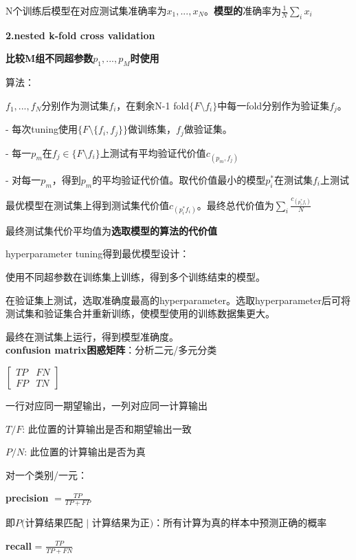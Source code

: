 \documentclass[UTF8]{ctexart}
\begin{document}
  \quad \quad \quad N个训练后模型在对应测试集准确率为${x_1, ..., x_N}$。\textbf{模型的}准确率为$\frac{1}{N}\sum_ix_i$

  \quad \textbf{2.nested k-fold cross validation}

  \quad \quad \textbf{比较M组不同超参数$p_1, ..., p_M$时使用}

  \quad \quad 算法：
  
  \quad \quad \quad $f_1, ..., f_N$分别作为测试集$f_i$，在剩余N-1 fold$\{F\setminus f_i\}$中每一fold分别作为验证集$f_j$。

  \quad \quad \quad - 每次tuning使用$\{F\setminus \{f_i, f_j\}\}$做训练集，$f_j$做验证集。

  \quad \quad \quad - 每一$p_m$在$f_j \in \{F \setminus f_i\}$上测试有平均验证代价值$c_{(p_m, f_j)}$

  \quad \quad \quad - 对每一$p_m$，得到$p_m$的平均验证代价值。取代价值最小的模型$p^*_i$在测试集$f_i$上测试

  \quad \quad \quad 最优模型在测试集上得到测试集代价值$c_{(p^*_i f_i)}$。最终总代价值为$\sum_i\frac{c_{(p^*_i f_i)} }{N}$

  \quad \quad \quad 最终测试集代价平均值为\textbf{选取模型的算法的代价值}

  hyperparameter tuning得到最优模型设计：
  
  \quad 使用不同超参数在训练集上训练，得到多个训练结束的模型。
  
  \quad 在验证集上测试，选取准确度最高的hyperparameter。选取hyperparameter后可将测试集和验证集合并重新训练，使模型使用的训练数据集更大。
  
  \quad 最终在测试集上运行，得到模型准确度。\\
\textbf{confusion matrix困惑矩阵}：分析二元/多元分类
  
  $\begin{bmatrix}
    TP & FN \\
    FP & TN
  \end{bmatrix}$

  一行对应同一期望输出，一列对应同一计算输出

  $T/F$: 此位置的计算输出是否和期望输出一致

  $P/N$: 此位置的计算输出是否为真

  对一个类别/一元：

  \quad \textbf{precision} $= \frac{TP}{TP + FP}$

  \quad \quad 即$P($计算结果匹配 $|$ 计算结果为正$)$：所有计算为真的样本中预测正确的概率

  \quad \textbf{recall} = $\frac{TP}{TP + FN}$
\end{document}
